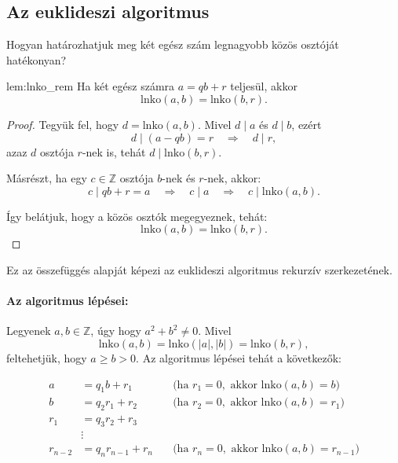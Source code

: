 \subsection*{Az euklideszi algoritmus}

Hogyan határozhatjuk meg két egész szám legnagyobb közös osztóját
hatékonyan?
\begin{lemma}{lem:lnko_rem}
Ha két egész számra $a=qb+r$ teljesül, akkor 
\[
\mathrm{lnko}(a,b)=\mathrm{lnko}(b,r).
\]
\end{lemma}

\begin{proof}
Tegyük fel, hogy $d=\mathrm{lnko}(a,b)$. Mivel $d\mid a$ és $d\mid b$,
ezért 
\[
d\mid(a-qb)=r\quad\Rightarrow\quad d\mid r,
\]
azaz $d$ osztója $r$-nek is, tehát $d\mid\mathrm{lnko}(b,r)$.

Másrészt, ha egy $c\in\mathbb{Z}$ osztója $b$-nek és $r$-nek, akkor:
\[
c\mid qb+r=a\quad\Rightarrow\quad c\mid a\quad\Rightarrow\quad c\mid\mathrm{lnko}(a,b).
\]

Így belátjuk, hogy a közös osztók megegyeznek, tehát: 
\[
\mathrm{lnko}(a,b)=\mathrm{lnko}(b,r).
\]
\end{proof}
Ez az összefüggés alapját képezi az euklideszi algoritmus rekurzív
szerkezetének.

\paragraph{\textbf{Az algoritmus lépései:}}

Legyenek $a,b\in\mathbb{Z}$, úgy hogy $a^{2}+b^{2}\neq0$. Mivel
\[
\mathrm{lnko}(a,b)=\mathrm{lnko}(|a|,|b|)=\mathrm{lnko}(b,r),
\]
feltehetjük, hogy $a\geq b>0$. Az algoritmus lépései tehát a következők:

\begin{align*}
a & =q_{1}b+r_{1}\quad & \text{(ha }r_{1}=0,\text{ akkor }\mathrm{lnko}(a,b)=b)\\
b & =q_{2}r_{1}+r_{2}\quad & \text{(ha }r_{2}=0,\text{ akkor }\mathrm{lnko}(a,b)=r_{1})\\
r_{1} & =q_{3}r_{2}+r_{3}\\
 & \vdots\\
r_{n-2} & =q_{n}r_{n-1}+r_{n}\quad & \text{(ha }r_{n}=0,\text{ akkor }\mathrm{lnko}(a,b)=r_{n-1})
\end{align*}

